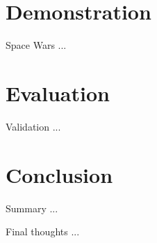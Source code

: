\documentclass{beamer}
\begin{document}
\section{Demonstration}
\begin{frame}{Space Wars}
...
\end{frame}
\section{Evaluation}
\begin{frame}{Validation}
...
\end{frame}
\section{Conclusion}
\begin{frame}{Summary}
...
\end{frame}
\begin{frame}{Final thoughts}
...
\end{frame}
\end{document}

